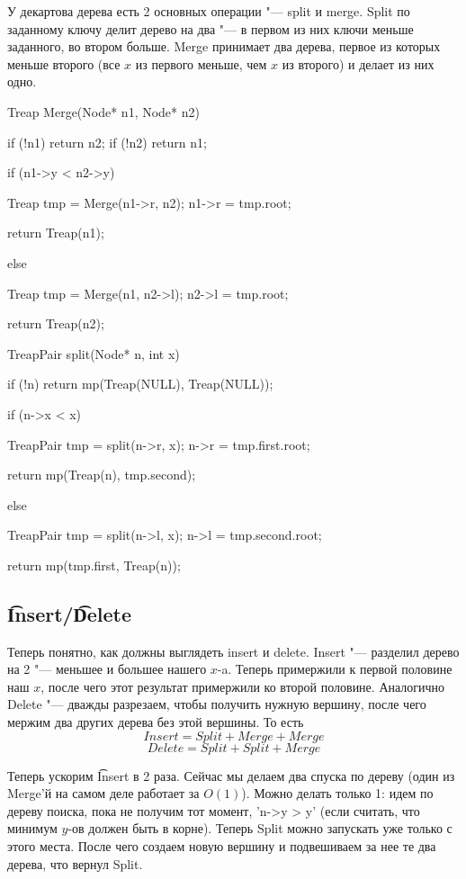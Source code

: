 У декартова дерева есть 2 основных операции "--- split и merge.
Split по заданному ключу делит дерево на два "--- в первом из них ключи меньше заданного, во втором больше.
Merge принимает два дерева, первое из которых меньше второго (все $x$ из первого меньше, чем $x$ из второго) и делает из них одно.

\begin{cppcode}
Treap Merge(Node* n1, Node* n2) {
    if (!n1) {
        return n2;
    }
    if (!n2) {
        return n1;
    }

    if (n1->y < n2->y) {
        Treap tmp = Merge(n1->r, n2);
        n1->r = tmp.root;

        return Treap(n1);
    } else {
        Treap tmp = Merge(n1, n2->l);
        n2->l = tmp.root;

        return Treap(n2);
    }
}
\end{cppcode}


\begin{cppcode}
TreapPair split(Node* n, int x) {
    if (!n) {
        return mp(Treap(NULL), Treap(NULL));
    }

    if (n->x < x) {
        TreapPair tmp = split(n->r, x);
        n->r = tmp.first.root;

        return mp(Treap(n), tmp.second);
    } else {
        TreapPair tmp = split(n->l, x);
        n->l = tmp.second.root;

        return mp(tmp.first, Treap(n));
    }
}
\end{cppcode}


\subsection{\t{Insert}/\t{Delete}}

Теперь понятно, как должны выглядеть insert и delete.
Insert "--- разделил дерево на 2 "--- меньшее и большее нашего $x$-a.
Теперь примержили к первой половине наш $x$, после чего этот результат примержили ко второй половине.
Аналогично Delete "--- дважды разрезаем, чтобы получить нужную вершину, после чего мержим два других дерева без этой вершины.
То есть
\[ Insert = Split + Merge + Merge \]
\[ Delete = Split + Split + Merge \]

Теперь ускорим \t{Insert} в 2 раза.
Сейчас мы делаем два спуска по дереву (один из Merge'й на самом деле работает за $O(1)$).
Можно делать только 1: идем по дереву поиска, пока не получим тот момент, \cpp'n->y > y'
(если считать, что минимум $y$-ов должен быть в корне).
Теперь Split можно запускать уже только с этого места.
После чего создаем новую вершину и подвешиваем за нее те два дерева, что вернул Split.

